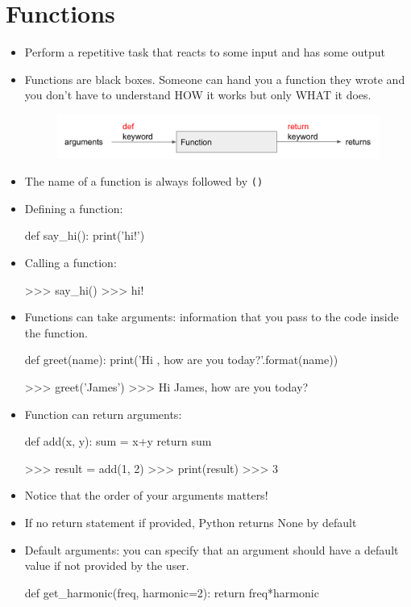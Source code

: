 \documentclass[12pt]{article}
\numberwithin{equation}{section}
\begin{document}
\section{Functions}
\begin{itemize}
    \item Perform a repetitive task that reacts to some input and has some output
    \item Functions are black boxes. Someone can hand you a function they wrote and you don't have to understand HOW it works but only WHAT it does.
    \begin{figure}[H]
	    \centering
	    \includegraphics[width=12cm] {box}
    \end{figure}
    \item The name of a function is always followed by \verb|()|
    \item Defining a function: 
    \begin{python}
    def say_hi():
        print('hi!')
    \end{python}
    \item Calling a function:
    \begin{python}
    >>> say_hi()
    >>> hi!
    \end{python}
    \item Functions can take arguments: information that you pass to the code inside the function.
    \begin{python}
    def greet(name):
        print('Hi {}, how are you today?'.format(name))
        
    >>> greet('James')
    >>> Hi James, how are you today?
    \end{python}
    \item Function can return arguments:
    \begin{python}
    def add(x, y):
        sum = x+y
        return sum
        
    >>> result = add(1, 2)
    >>> print(result)
    >>> 3
    \end{python}
    \item Notice that the order of your arguments matters!
    \item If no return statement if provided, Python returns None by default
    \item Default arguments: you can specify that an argument should have a default value if not provided by the user.
    \begin{python}
    def get_harmonic(freq, harmonic=2):
        return freq*harmonic
    

\end{python}
\end{itemize}
\end{document}
